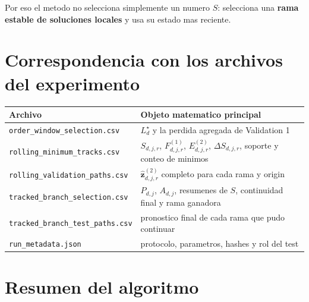 \documentclass[11pt]{article}
\begin{document}
Por eso el metodo no selecciona simplemente un numero \(S\): selecciona una
\textbf{rama estable de soluciones locales} y usa su estado mas reciente.

\section{Correspondencia con los archivos del experimento}

\begin{center}
\begin{tabular}{p{} p{}}
\toprule
Archivo & Objeto matematico principal\\
\midrule
\texttt{order\_window\_selection.csv}
&
\(L_d^\star\) y la perdida agregada de Validation 1
\\
\texttt{rolling\_minimum\_tracks.csv}
&
\(S_{d,j,r}\), \(F^{(1)}_{d,j,r}\), \(E^{(2)}_{d,j,r}\),
\(\Delta S_{d,j,r}\), soporte y conteo de minimos
\\
\texttt{rolling\_validation\_paths.csv}
&
\(\widehat{\bm z}^{(2)}_{d,j,r}\) completo para cada rama y origin
\\
\texttt{tracked\_branch\_selection.csv}
&
\(P_{d,j}\), \(A_{d,j}\), resumenes de \(S\), continuidad final y rama ganadora
\\
\texttt{tracked\_branch\_test\_paths.csv}
&
pronostico final de cada rama que pudo continuar
\\
\texttt{run\_metadata.json}
&
protocolo, parametros, hashes y rol del test
\\
\bottomrule
\end{tabular}
\end{center}

\section{Resumen del algoritmo}
\end{document}
